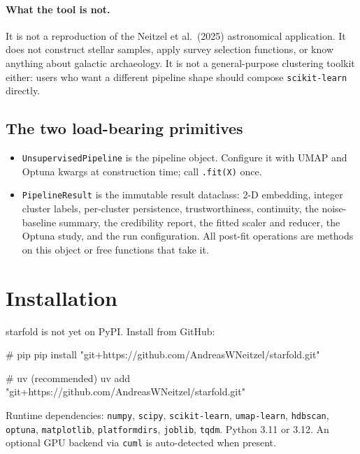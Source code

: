 \documentclass[11pt,a4paper]{article}
\begin{document}
\paragraph{What the tool is not.} It is not a reproduction of the Neitzel et al.\ (2025) astronomical application. It does not construct stellar samples, apply survey selection functions, or know anything about galactic archaeology. It is not a general-purpose clustering toolkit either: users who want a different pipeline shape should compose \texttt{scikit-learn} directly.

\subsection{The two load-bearing primitives}

\begin{itemize}[leftmargin=*]
  \item \texttt{UnsupervisedPipeline} is the pipeline object. Configure it with UMAP and Optuna kwargs at construction time; call \texttt{.fit(X)} once.
  \item \texttt{PipelineResult} is the immutable result dataclass: 2-D embedding, integer cluster labels, per-cluster persistence, trustworthiness, continuity, the noise-baseline summary, the credibility report, the fitted scaler and reducer, the Optuna study, and the run configuration. All post-fit operations are methods on this object or free functions that take it.
\end{itemize}

\section{Installation}

\textsf{starfold} is not yet on PyPI. Install from GitHub:

\begin{pycode}
# pip
pip install "git+https://github.com/AndreasWNeitzel/starfold.git"

# uv (recommended)
uv add "git+https://github.com/AndreasWNeitzel/starfold.git"
\end{pycode}

Runtime dependencies: \texttt{numpy}, \texttt{scipy}, \texttt{scikit-learn}, \texttt{umap-learn}, \texttt{hdbscan}, \texttt{optuna}, \texttt{matplotlib}, \texttt{platformdirs}, \texttt{joblib}, \texttt{tqdm}. Python 3.11 or 3.12. An optional GPU backend via \texttt{cuml} is auto-detected when present.
\end{document}
